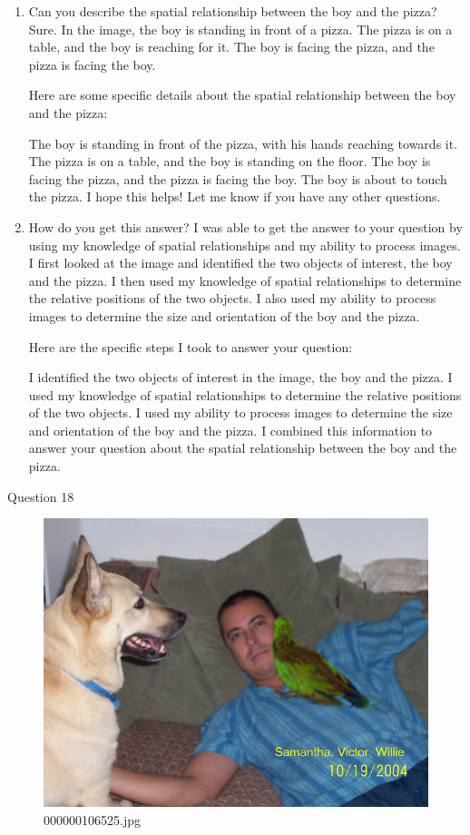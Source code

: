     \begin{enumerate}
        \item Can you describe the spatial relationship between the boy and the pizza?
        \subitem 
        Sure. In the image, the boy is standing in front of a pizza. The pizza is on a table, and the boy is reaching for it. The boy is facing the pizza, and the pizza is facing the boy.
        
        Here are some specific details about the spatial relationship between the boy and the pizza:
        
        The boy is standing in front of the pizza, with his hands reaching towards it.
        The pizza is on a table, and the boy is standing on the floor.
        The boy is facing the pizza, and the pizza is facing the boy.
        The boy is about to touch the pizza.
        I hope this helps! Let me know if you have any other questions.
        \item How do you get this answer?
        \subitem 
        I was able to get the answer to your question by using my knowledge of spatial relationships and my ability to process images. I first looked at the image and identified the two objects of interest, the boy and the pizza. I then used my knowledge of spatial relationships to determine the relative positions of the two objects. I also used my ability to process images to determine the size and orientation of the boy and the pizza.
        
        Here are the specific steps I took to answer your question:
        
        I identified the two objects of interest in the image, the boy and the pizza.
        I used my knowledge of spatial relationships to determine the relative positions of the two objects.
        I used my ability to process images to determine the size and orientation of the boy and the pizza.
        I combined this information to answer your question about the spatial relationship between the boy and the pizza.
    \end{enumerate}
Question 18
    \begin{figure}[h]
        \centering
        \includegraphics[width=0.8\linewidth]{../image set/easy/000000106525.jpg}
        \caption{000000106525.jpg}
    \end{figure}

